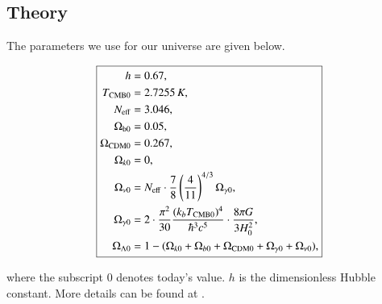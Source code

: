 \documentclass{aa}
\begin{document}
     


\subsection{Theory}
The parameters we use for our universe are given below.


\begin{equation}
      \boxed{
   \begin{aligned}
      h &= 0.67, \\
      T_{\rm CMB 0} &= 2.7255\,K, \\
      N_{\rm eff} &= 3.046, \\
      \Omega_{\rm b 0} &= 0.05, \\
      \Omega_{\rm CDM 0} &= 0.267,\\
      \Omega_{k 0} &= 0, \\
      \Omega_{\nu 0} &= N_{\rm eff}\cdot \frac{7}{8}\left(\frac{4}{11}\right)^{4/3}\Omega_{\gamma 0}, \\
      \Omega_{\gamma 0} &= 2\cdot \frac{\pi^2}{30} \frac{(k_bT_{\rm CMB 0})^4}{\hbar^3 c^5} \cdot \frac{8\pi G}{3H_0^2},\\
      \Omega_{\Lambda 0} &= 1 - (\Omega_{k 0}+\Omega_{b 0}+\Omega_{\rm CDM 0}+\Omega_{\gamma 0}+\Omega_{\nu 0}),
   \end{aligned}}
\end{equation}

\vspace*{0.3cm}
\noindent
where the subscript 0 denotes today's value. $h$ is the dimensionless Hubble constant. More details can be found at \cite{winther:2023}. \\ \\
\end{document}
